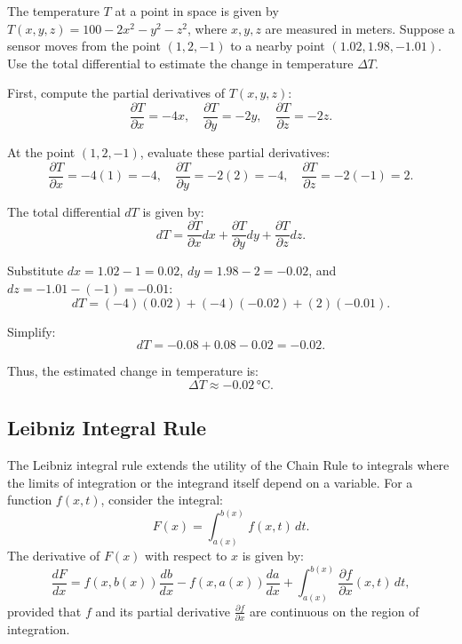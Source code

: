 \exampleline
\begin{example}
The temperature \( T \) at a point in space is given by \( T(x, y, z) = 100 - 2x^2 - y^2 - z^2 \), where \( x, y, z \) are measured in meters. Suppose a sensor moves from the point \( (1, 2, -1) \) to a nearby point \( (1.02, 1.98, -1.01) \). Use the total differential to estimate the change in temperature \( \Delta T \).

\begin{solution}
First, compute the partial derivatives of \( T(x, y, z) \):
\[
\frac{\partial T}{\partial x} = -4x, \quad \frac{\partial T}{\partial y} = -2y, \quad \frac{\partial T}{\partial z} = -2z.
\]

At the point \( (1, 2, -1) \), evaluate these partial derivatives:
\[
\frac{\partial T}{\partial x} = -4(1) = -4, \quad \frac{\partial T}{\partial y} = -2(2) = -4, \quad \frac{\partial T}{\partial z} = -2(-1) = 2.
\]

The total differential \( dT \) is given by:
\[
dT = \frac{\partial T}{\partial x} dx + \frac{\partial T}{\partial y} dy + \frac{\partial T}{\partial z} dz.
\]

Substitute \( dx = 1.02 - 1 = 0.02 \), \( dy = 1.98 - 2 = -0.02 \), and \( dz = -1.01 - (-1) = -0.01 \):
\[
dT = (-4)(0.02) + (-4)(-0.02) + (2)(-0.01).
\]

Simplify:
\[
dT = -0.08 + 0.08 - 0.02 = -0.02.
\]

Thus, the estimated change in temperature is:
\[
\Delta T \approx -0.02 \, \text{°C}.
\]
\end{solution}
\end{example}
\exampleline

\subsection*{Leibniz Integral Rule} 

\noindent The Leibniz integral rule extends the utility of the Chain Rule to integrals where the limits of integration or the integrand itself depend on a variable. For a function \( f(x, t) \), consider the integral:
\[
F(x) = \int_{a(x)}^{b(x)} f(x, t) \, dt.
\]
The derivative of \( F(x) \) with respect to \( x \) is given by:
\[
\frac{dF}{dx} = f(x, b(x)) \frac{db}{dx} - f(x, a(x)) \frac{da}{dx} + \int_{a(x)}^{b(x)} \frac{\partial f}{\partial x}(x, t) \, dt,
\]
provided that \( f \) and its partial derivative \( \frac{\partial f}{\partial x} \) are continuous on the region of integration.

